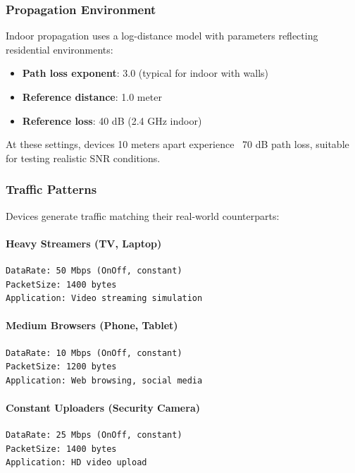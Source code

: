 \subsubsection{Propagation Environment}

Indoor propagation uses a log-distance model with parameters reflecting residential environments:
\begin{itemize}
    \item \textbf{Path loss exponent}: 3.0 (typical for indoor with walls)
    \item \textbf{Reference distance}: 1.0 meter
    \item \textbf{Reference loss}: 40 dB (2.4 GHz indoor)
\end{itemize}

At these settings, devices 10 meters apart experience ~70 dB path loss, suitable for testing realistic SNR conditions.

\subsubsection{Traffic Patterns}

Devices generate traffic matching their real-world counterparts:

\paragraph{Heavy Streamers (TV, Laptop)}
\begin{lstlisting}[style=cpp]
DataRate: 50 Mbps (OnOff, constant)
PacketSize: 1400 bytes
Application: Video streaming simulation
\end{lstlisting}

\paragraph{Medium Browsers (Phone, Tablet)}
\begin{lstlisting}[style=cpp]
DataRate: 10 Mbps (OnOff, constant)
PacketSize: 1200 bytes
Application: Web browsing, social media
\end{lstlisting}

\paragraph{Constant Uploaders (Security Camera)}
\begin{lstlisting}[style=cpp]
DataRate: 25 Mbps (OnOff, constant)
PacketSize: 1400 bytes
Application: HD video upload
\end{lstlisting}

